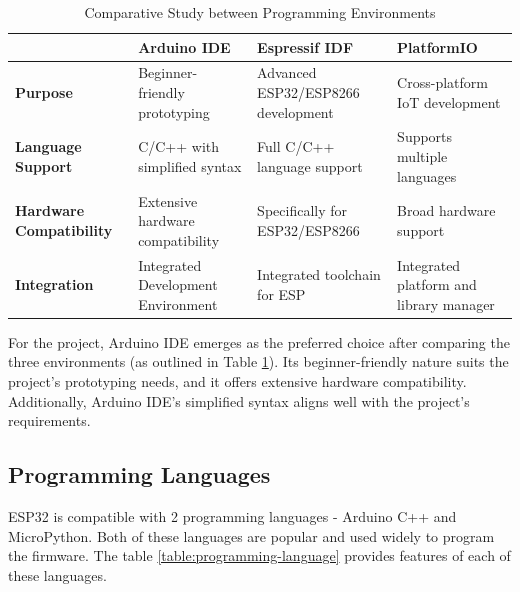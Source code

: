 \begin{table}[h]
    \centering
    \begin{tabularx}{\textwidth}{|X|X|X|X|}
        \hline
            
         & \textbf{Arduino IDE} 
         & \textbf{Espressif IDF} 
         & \textbf{PlatformIO} \\ \hline

         \textbf{Purpose} 
         & Beginner-friendly prototyping 
         & Advanced ESP32/ESP8266 development
         & Cross-platform IoT development \\ \hline

         \textbf{Language Support}
         & C/C++ with simplified syntax
         & Full C/C++ language support
         & Supports multiple languages \\ \hline

         \textbf{Hardware Compatibility}
         & Extensive hardware compatibility
         & Specifically for ESP32/ESP8266 
         & Broad hardware support \\ \hline

         \textbf{Integration}
         & Integrated Development Environment
         & Integrated toolchain for ESP 
         & Integrated platform and library manager \\ \hline
    
    \end{tabularx}
    \caption{Comparative Study between Programming Environments}
    \label{table:programming-environment}
\end{table}

For the project, Arduino IDE emerges as the preferred choice after comparing the three environments (as outlined in Table \ref{table:programming-environment}). Its beginner-friendly nature suits the project's prototyping needs, and it offers extensive hardware compatibility. Additionally, Arduino IDE's simplified syntax aligns well with the project's requirements.

\subsection{Programming Languages}
ESP32 is compatible with 2 programming languages - Arduino C++ and MicroPython. Both of these languages are popular and used widely to program the firmware. The table \ref{table:programming-language} provides features of each of these languages.

